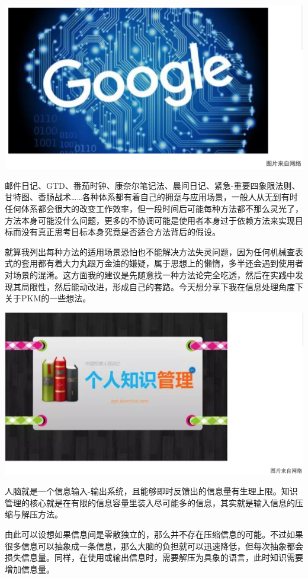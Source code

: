 \documentclass[]{book}
\begin{document}
\includegraphics[width=8.33in]{images/gtd1}

邮件日记、GTD、番茄时钟、康奈尔笔记法、晨间日记、紧急-重要四象限法则、甘特图、香肠战术\ldots{}\ldots{}各种体系都有着自己的拥趸与应用场景，一般人从无到有时任何体系都会很大的改变工作效率，但一段时间后可能每种方法都不那么灵光了，方法本身可能没什么问题，更多的不协调可能是使用者本身过于依赖方法来实现目标而没有真正思考目标本身究竟是否适合方法背后的假设。

就算我列出每种方法的适用场景恐怕也不能解决方法失灵问题，因为任何机械查表式的套用都有着大力丸跟万金油的嫌疑，属于思想上的懒惰，多半还会遇到使用者对场景的混淆。这方面我的建议是先随意找一种方法论完全吃透，然后在实践中发现其局限性，然后能动改进，形成自己的套路。今天想分享下我在信息处理角度下关于PKM的一些想法。

\includegraphics[width=8.33in]{images/gtd2}

人脑就是一个信息输入-输出系统，且能够即时反馈出的信息量有生理上限。知识管理的核心就是在有限的信息容量里装入尽可能多的信息，其实就是输入信息的压缩与解压方法。

由此可以设想如果信息间是零散独立的，那么并不存在压缩信息的可能。不过如果很多信息可以抽象成一条信息，那么大脑的负担就可以迅速降低，但每次抽象都会损失信息量。同样，在使用或输出信息时，需要解压为具象的语言，此时知识需要增加信息量。
\end{document}

